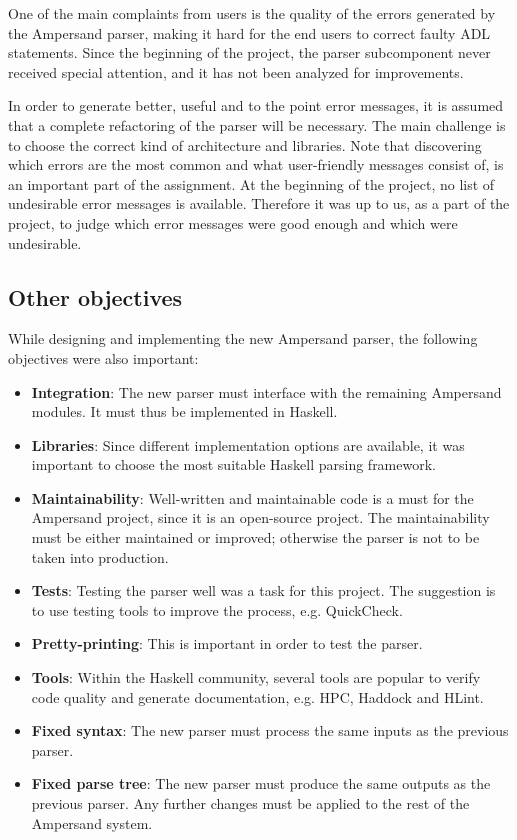 One of the main complaints from users is the quality of the errors generated by the Ampersand parser, making it hard for the end users to correct faulty ADL statements.
Since the beginning of the project, the parser subcomponent never received special attention, and it has not been analyzed for improvements.

In order to generate better, useful and to the point error messages, it is assumed that a complete refactoring of the parser will be necessary.
The main challenge is to choose the correct kind of architecture and libraries.
Note that discovering which errors are the most common and what user-friendly messages consist of, is an important part of the assignment.
At the beginning of the project, no list of undesirable error messages is available.
Therefore it was up to us, as a part of the project, to judge which error messages were good enough and which were undesirable.

\subsection{Other objectives}
While designing and implementing the new Ampersand parser, the following objectives were also important:
\begin{itemize}
  \item \textbf{Integration}: The new parser must interface with the remaining Ampersand modules.
    It must thus be implemented in Haskell.
  \item \textbf{Libraries}: Since different implementation options are available, it was important to choose the most suitable Haskell parsing framework.
  \item \textbf{Maintainability}: Well-written and maintainable code is a must for the Ampersand project, since it is an open-source project.
    The maintainability must be either maintained or improved; otherwise the parser is not to be taken into production.
  \item \textbf{Tests}: Testing the parser well was a task for this project.
    The suggestion is to use testing tools to improve the process, e.g. QuickCheck.
  \item \textbf{Pretty-printing}: This is important in order to test the parser.
%
%
%
  \item \textbf{Tools}: Within the Haskell community, several tools are popular to verify code quality and generate documentation, e.g. HPC, Haddock and HLint.
  \item \textbf{Fixed syntax}: The new parser must process the same inputs as the previous parser.
  \item \textbf{Fixed parse tree}: The new parser must produce the same outputs as the previous parser.
    Any further changes must be applied to the rest of the Ampersand system.
\end{itemize}

